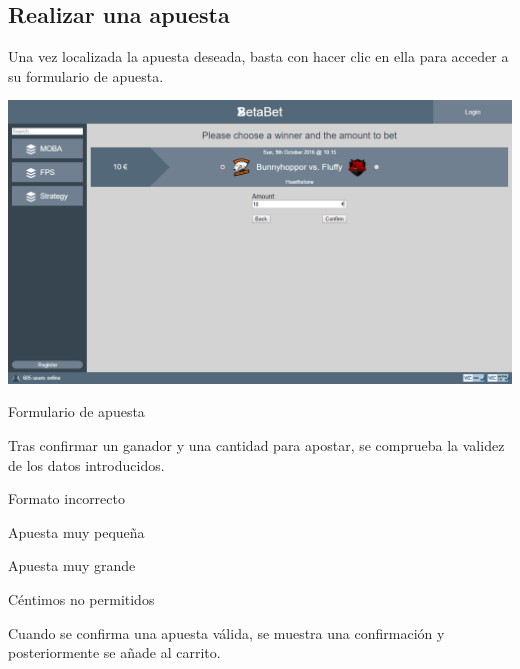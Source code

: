 \documentclass{article}
\begin{document}
\subsection{Realizar una apuesta}
Una vez localizada la apuesta deseada, basta con hacer clic en ella para acceder a su formulario de apuesta.
\smallskip\newline
\begin{minipage}{\linewidth}
    \centering
    \captionsetup{type=figure}
    \includegraphics[width=.9\linewidth]{fig5}
    \caption{Formulario de apuesta}
    \label{fig:fig5}
\end{minipage}
\smallskip\newline
Tras confirmar un ganador y una cantidad para apostar, se comprueba la validez de los datos introducidos.
\begin{multicols}{4}
\begin{center}
    Formato incorrecto
\end{center}
\columnbreak
\begin{center}
    Apuesta muy pequeña
\end{center}
\columnbreak
\begin{center}
    Apuesta muy grande
\end{center}
\columnbreak
\begin{center}
    Céntimos no permitidos
\end{center}
\end{multicols}
Cuando se confirma una apuesta válida, se muestra una confirmación y posteriormente se añade al carrito.
\smallskip\newline
\end{document}
